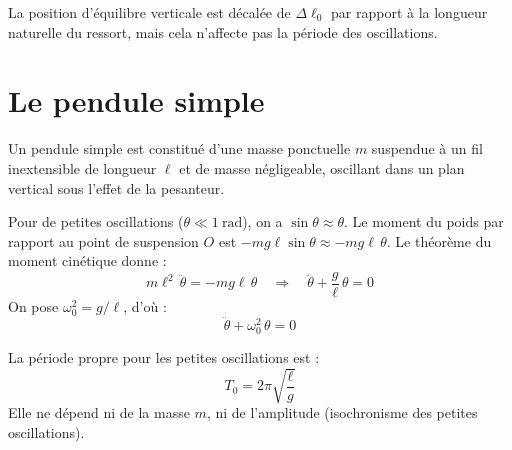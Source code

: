 \begin{remarque}
La position d'équilibre verticale est décalée de $\Delta\ell_0$ par rapport à la longueur naturelle du ressort, mais cela n'affecte pas la période des oscillations.
\end{remarque}

\section{Le pendule simple}

\begin{definition}
Un pendule simple est constitué d'une masse ponctuelle $m$ suspendue à un fil inextensible de longueur $\ell$ et de masse négligeable, oscillant dans un plan vertical sous l'effet de la pesanteur.
\end{definition}

\begin{illus}
\end{illus}

\begin{loi}
Pour de petites oscillations ($\theta \ll \SI{1}{\radian}$), on a $\sin\theta \approx \theta$. Le moment du poids par rapport au point de suspension $O$ est $-mg\ell\sin\theta \approx -mg\ell\,\theta$. Le théorème du moment cinétique donne :
\[
m\ell^2\,\ddot{\theta} = -mg\ell\,\theta \quad\Longrightarrow\quad \ddot{\theta} + \frac{g}{\ell}\,\theta = 0
\]
On pose $\omega_0^2 = g/\ell$, d'où :
\[
\boxed{\ddot{\theta} + \omega_0^2\,\theta = 0}
\]
\end{loi}

\begin{definition}
La période propre pour les petites oscillations est :
\[
T_0 = 2\pi\sqrt{\frac{\ell}{g}}
\]
Elle ne dépend ni de la masse $m$, ni de l'amplitude (isochronisme des petites oscillations).
\end{definition}

